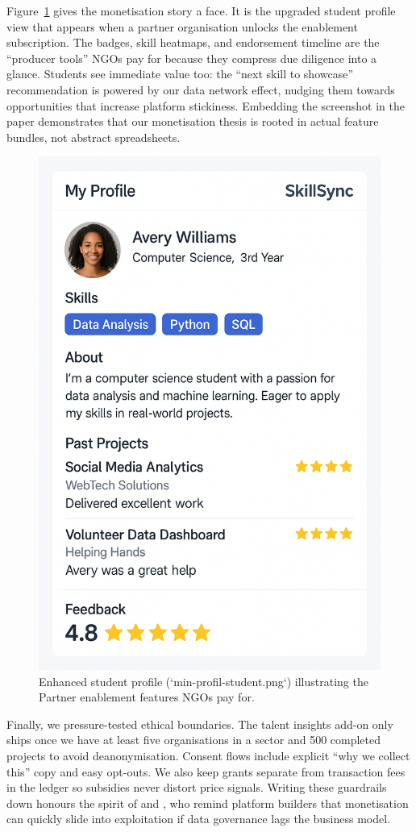 Figure~\ref{fig:student-profile} gives the monetisation story a face. It is the upgraded student profile view that appears when a partner organisation unlocks the enablement subscription. The badges, skill heatmaps, and endorsement timeline are the ``producer tools'' NGOs pay for because they compress due diligence into a glance. Students see immediate value too: the ``next skill to showcase'' recommendation is powered by our data network effect, nudging them towards opportunities that increase platform stickiness. Embedding the screenshot in the paper demonstrates that our monetisation thesis is rooted in actual feature bundles, not abstract spreadsheets.

\begin{figure}[h]
  \centering
  \includegraphics[width=0.8\linewidth]{figures/min-profil-student.png}
  \caption{Enhanced student profile (`min-profil-student.png`) illustrating the Partner enablement features NGOs pay for.}
  \label{fig:student-profile}
\end{figure}

Finally, we pressure-tested ethical boundaries. The talent insights add-on only ships once we have at least five organisations in a sector and 500 completed projects to avoid deanonymisation. Consent flows include explicit ``why we collect this'' copy and easy opt-outs. We also keep grants separate from transaction fees in the ledger so subsidies never distort price signals. Writing these guardrails down honours the spirit of \citet{Zuboff2019} and \citet{Srnicek2017}, who remind platform builders that monetisation can quickly slide into exploitation if data governance lags the business model.
